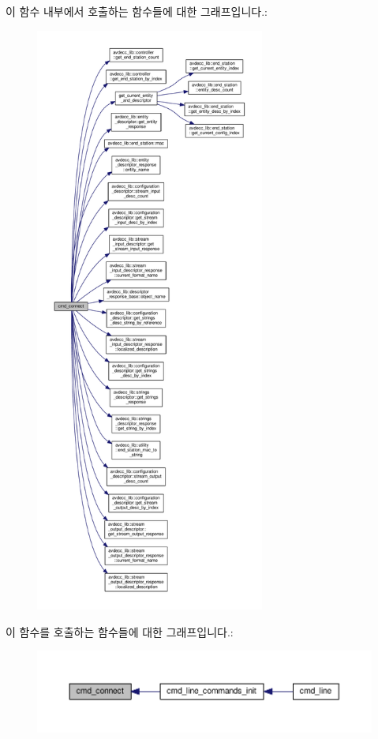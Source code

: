 이 함수 내부에서 호출하는 함수들에 대한 그래프입니다.\+:
\nopagebreak
\begin{figure}[H]
\begin{center}
\leavevmode
\includegraphics[height=550pt]{classcmd__line_a3378afaff29dbd27e191a20fad8ab9cd_cgraph}
\end{center}
\end{figure}




이 함수를 호출하는 함수들에 대한 그래프입니다.\+:
\nopagebreak
\begin{figure}[H]
\begin{center}
\leavevmode
\includegraphics[width=350pt]{classcmd__line_a3378afaff29dbd27e191a20fad8ab9cd_icgraph}
\end{center}
\end{figure}


